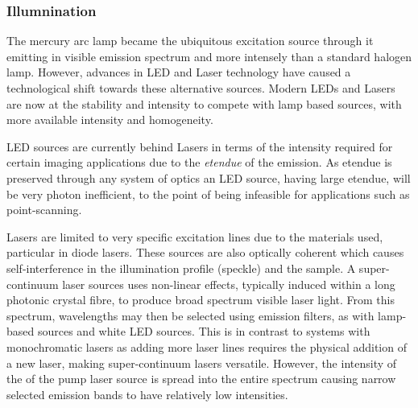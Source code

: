 \subsubsection{Illumnination}

The mercury arc lamp became the ubiquitous excitation source through it emitting in visible emission spectrum and more intensely than a standard halogen lamp.
However, advances in \gls{LED} and \gls{Laser} technology have caused a technological shift towards these alternative sources.
Modern \gls{LED}s and \gls{Laser}s are now at the stability and intensity to compete with lamp based sources, with more available intensity and homogeneity.

\gls{LED} sources are currently behind Lasers in terms of the intensity required for certain imaging applications due to the \emph{\gls{etendue}} of the emission.
As \gls{etendue} is preserved through any system of optics an \gls{LED} source, having large \gls{etendue}, will be very photon inefficient, to the point of being infeasible for applications such as point-scanning.

\gls{Laser}s are limited to very specific excitation lines due to the materials used, particular in diode lasers.
These sources are also optically \gls{coherent} which causes self-interference in the illumination profile (speckle) and the sample.
A \gls{super-continuum laser} sources uses non-linear effects, typically induced within a long photonic crystal fibre, to produce broad spectrum visible laser light.
From this spectrum, wavelengths may then be selected using emission filters, as with lamp-based sources and white LED sources.
This is in contrast to systems with monochromatic lasers as adding more laser lines requires the physical addition of a new laser, making \gls{super-continuum laser}s versatile.
However, the intensity of the of the pump laser source is spread into the entire spectrum causing narrow selected emission bands to have relatively low intensities.

